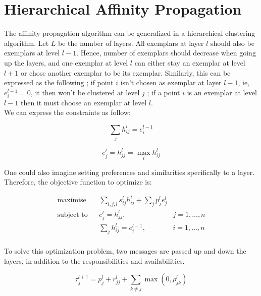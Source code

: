 \documentclass{ipol}
\begin{document}
\section{Hierarchical Affinity Propagation}

The affinity propagation algorithm can be generalized in a hierarchical
clustering algorithm. Let $L$ be the number of layers. All exemplars at layer
$l$ should also be exemplars at level $l -1$. Hence, number of exemplars
should decrease when going up the layers, and one exemplar at level $l$ can
either stay an exemplar at level $l + 1$ or chose another exemplar to be its
exemplar. Similarly, this can be expressed as the following ; if point $i$ isn't chosen as
exemplar at layer $l - 1$, ie, $e_{i}^{l - 1} = 0$, it then won't be clustered at
level $j$ ; if a point $i$ is an exemplar at level $l -1$ then it must choose
an exemplar at level $l$.\\
We can express the constraints as follow:

\begin{equation}
\sum_{j} h_{ij}^l = e_i^{l-1}
\end{equation}

\begin{equation}
e_j^l = h_{jj}^l = \max_i h_{ij}^l
\end{equation}

One could also imagine setting preferences and similarities specifically to a
layer. Therefore, the objective function to optimize is:

\begin{equation*}
\renewcommand{\arraystretch}{2}
\begin{array}{ccll}
\text{maximise} & & \sum_{i, j, l} s^l_{ij} h^l_{ij} + \sum_{j} p^l_j e^l_j \\
\text{subject to} &  & e^l_{j} = h^l_{jj}, & j = 1, \dots, n\\
		  &  & \sum_{j} h_{ij}^l = e_i^{l-1}, & i = 1, \dots, n\\

\end{array}
\end{equation*}

To solve this optimization problem, two messages are passed up and down the
layers, in addition to the responsibilities and availabilities.

\begin{equation}
\tau_j^{l + 1} = p^l_j + r_{jj}^l + \sum_{k \neq j} \max (0, \rho^l_{jk})
\end{equation}
\end{document}

